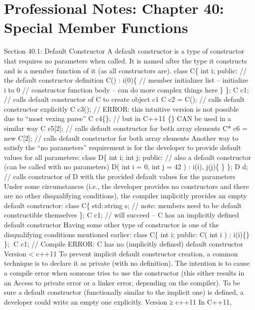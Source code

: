 \hypertarget{professional-notes-chapter-40-special-member-functions-1}{%
\chapter{Professional Notes: Chapter 40: Special Member
Functions}\label{professional-notes-chapter-40-special-member-functions-1}}

Section 40.1: Default Constructor A default constructor is a type of
constructor that requires no parameters when called. It is named after
the type it constructs and is a member function of it (as all
constructors are). class C\{ int i; public: // the default constructor
definition C() : i(0)\{ // member initializer list -- initialize i to 0
// constructor function body -- can do more complex things here \} \}; C
c1; // calls default constructor of C to create object c1 C c2 = C(); //
calls default constructor explicitly C c3(); // ERROR: this intuitive
version is not possible due to ``most vexing parse'' C c4\{\}; // but in
C++11 \{\} CAN be used in a similar way C c5{[}2{]}; // calls default
constructor for both array elements C* c6 = new C{[}2{]}; // calls
default constructor for both array elements Another way to satisfy the
``no parameters'' requirement is for the developer to provide default
values for all parameters: class D\{ int i; int j; public: // also a
default constructor (can be called with no parameters) D( int i = 0, int
j = 42 ) : i(i), j(j)\{ \} \}; D d; // calls constructor of D with the
provided default values for the parameters Under some circumstances
(i.e., the developer provides no constructors and there are no other
disqualifying conditions), the compiler implicitly provides an empty
default constructor: class C\{ std::string s; // note: members need to
be default constructible themselves \}; C c1; // will succeed -- C has
an implicitly defined default constructor Having some other type of
constructor is one of the disqualifying conditions mentioned earlier:
class C\{ int i; public: C( int i ) : i(i)\{\} \}; C c1; // Compile
ERROR: C has no (implicitly defined) default constructor Version
\textless{} c++11 To prevent implicit default constructor creation, a
common technique is to declare it as private (with no deﬁnition). The
intention is to cause a compile error when someone tries to use the
constructor (this either results in an Access to private error or a
linker error, depending on the compiler). To be sure a default
constructor (functionally similar to the implicit one) is deﬁned, a
developer could write an empty one explicitly. Version ≥ c++11 In C++11,
